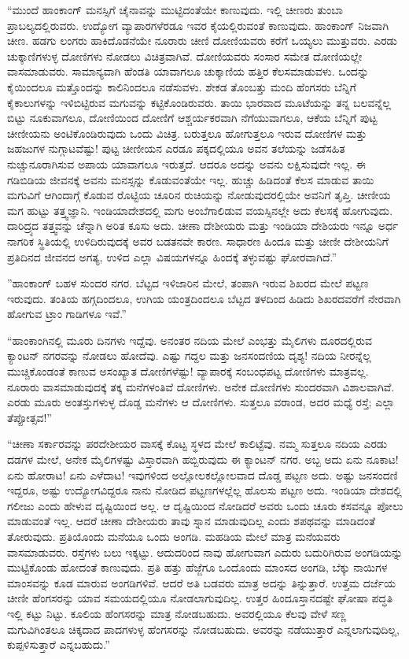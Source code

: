  “ಮುಂದೆ ಹಾಂಕಾಂಗ್ ಮನಸ್ಸಿಗೆ ಚೈನಾವನ್ನು ಮುಟ್ಟಿದಂತೆಯೇ ಕಾಣುವುದು. ಇಲ್ಲಿ ಚೀಣರು ತುಂಬಾ ಪ್ರಾಬಲ್ಯದಲ್ಲಿರುವರು. ಉದ್ಯೋಗ ವ್ಯಾಪಾರಗಳೆರಡೂ ಇವರ ಕೈಯಲ್ಲಿರುವಂತೆ ಕಾಣುವುದು. ಹಾಂಕಾಂಗ್ ನಿಜವಾಗಿ ಚೀಣ. ಹಡಗು ಲಂಗರು ಹಾಕಿದೊಡನೆಯೇ ನೂರಾರು ಚೀಣಿ ದೋಣಿಯವರು ಕರೆಗೆ ಒಯ್ಯಲು ಮುತ್ತುವರು. ಎರಡು ಚುಕ್ಕಾಣಿಗಳುಳ್ಳ ದೋಣಿಗಳು ನೋಡಲು ವಿಚಿತ್ರವಾಗಿವೆ. ದೋಣಿಯವರು ಸಂಸಾರ ಸಮೇತ ದೋಣಿಯಲ್ಲೇ ವಾಸಮಾಡುವರು. ಸಾಮಾನ್ಯವಾಗಿ ಹೆಂಡತಿ ಯಾವಾಗಲೂ ಚುಕ್ಕಾಣಿಯ ಹತ್ತಿರ ಕೆಲಸಮಾಡುವಳು. ಒಂದನ್ನು ಕೈಯಿಂದಲೂ ಮತ್ತೊಂದನ್ನು ಕಾಲಿನಿಂದಲೂ ನಡೆಸುವಳು. ಶೇಕಡ ತೊಂಬತ್ತು ಮಂದಿ ಹೆಂಗಸರು ಬೆನ್ನಿಗೆ ಕೈಕಾಲುಗಳನ್ನು ಇಳಿಬಿಟ್ಟಿರುವ ಮಗುವನ್ನು ಕಟ್ಟಿಕೊಂಡಿರುವರು. ತಾಯಿ ಭಾರವಾದ ಮೂಟೆಯನ್ನು ತನ್ನ ಬಲವನ್ನೆಲ್ಲ ಬಿಟ್ಟು ನೂಕುವಾಗಲೂ, ದೋಣಿಯಿಂದ ದೋಣಿಗೆ ಆಶ್ಚರ್ಯಕರವಾಗಿ ನೆಗೆಯುವಾಗಲೂ, ಆಕೆಯ ಬೆನ್ನಿಗೆ ಪುಟ್ಟ ಚೀಣೀಯನು ಅಂಟಿಕೊಂಡಿರುವುದು ಒಂದು ವಿಚಿತ್ರ. ಬರುತ್ತಲೂ ಹೋಗುತ್ತಲೂ ಇರುವ ದೋಣಿಗಳ ಮತ್ತು ಜಹಜುಗಳ ನುಗ್ಗಾಟವೆಷ್ಟು! ಪುಟ್ಟ ಚೀಣೀಯನ ಎರಡೂ ಪಕ್ಕದಲ್ಲಿಯೂ ಅವನ ತಲೆಯನ್ನು ಜಡೆಸಹಿತ ನುಚ್ಚುನೂರಾಗಿಸುವ ಅಪಾಯ ಯಾವಾಗಲೂ ಇರುತ್ತದೆ. ಆದರೂ ಅದನ್ನು ಅವನು ಲಕ್ಷಿಸುವುದೇ ಇಲ್ಲ. ಈ ಗಡಿಬಿಡಿಯ ಜೀವನಕ್ಕೆ ಅವನು ಮನಸ್ಸನ್ನು ಕೊಡುವಂತೆಯೇ ಇಲ್ಲ. ಹುಚ್ಚು ಹಿಡಿದಂತೆ ಕೆಲಸ ಮಾಡುವ ತಾಯಿ ಮಗುವಿಗೆ ಆಗಿಂದಾಗ್ಗೆ ಕೊಡುವ ರೊಟ್ಟಿಯ ಚೂರಿನ ರುಚಿಯನ್ನು ನೋಡುವುದರಲ್ಲಿಯೇ ಅವನಿಗೆ ತೃಪ್ತಿ. ಚೀಣೀಯ ಮಗ ಹುಟ್ಟು ತತ್ತ್ವಜ್ಞಾನಿ. ಇಂಡಿಯಾದೇಶದಲ್ಲಿ ಮಗು ಅಂಬೆಗಾಲಿಡುವ ವಯಸ್ಸಿನಲ್ಲೇ ಅದು ಕೆಲಸಕ್ಕೆ ಹೋಗುವುದು. ದಾರಿದ್ರ್ಯದ ತತ್ತ್ವವನ್ನು ಚೆನ್ನಾಗಿ ಅರಿತ ಕೂಸು ಅದು. ಚೀಣಾ ದೇಶೀಯರು ಮತ್ತು ಇಂಡಿಯಾ ದೇಶಿಯರು ಇನ್ನೂ ಅರ್ಧ ನಾಗರಿಕ ಸ್ಥಿತಿಯಲ್ಲಿ ಉಳಿದಿರುವುದಕ್ಕೆ ಅವರ ಬಡತನವೇ ಕಾರಣ. ಸಾಧಾರಣ ಹಿಂದೂ ಮತ್ತು ಚೀಣೀ ದೇಶೀಯನಿಗೆ ಪ್ರತಿದಿನದ ಜೀವನದ ಅಗತ್ಯ, ಉಳಿದ ಎಲ್ಲಾ ವಿಷಯಗಳನ್ನೂ ಹಿಂದಕ್ಕೆ ತಳ್ಳುವಷ್ಟು ಘೋರವಾಗಿದೆ.” 

”ಹಾಂಕಾಂಗ್ ಬಹಳ ಸುಂದರ ನಗರ. ಬೆಟ್ಟದ ಇಳಿಜಾರಿನ ಮೇಲೆ, ತಂಪಾಗಿ ಇರುವ ಶಿಖರದ ಮೇಲೆ ಪಟ್ಟಣ ಇರುವುದು. ತಂತಿಯ ಹಗ್ಗದಿಂದಲೂ, ಉಗಿಯ ಯಂತ್ರದಿಂದಲೂ ಬೆಟ್ಟದ ತಳದಿಂದ ಹಿಡಿದು ಶಿಖರದವರೆಗೆ ನೇರವಾಗಿ ಹೋಗುವ ಟ್ರಾಂ ಗಾಡಿಗಳೂ ಇವೆ.” 

 “ಹಾಂಕಾಂಗಿನಲ್ಲಿ ಮೂರು ದಿನಗಳು ಇದ್ದೆವು. ಅನಂತರ ನದಿಯ ಮೇಲೆ ಎಂಭತ್ತು ಮೈಲಿಗಳು ದೂರದಲ್ಲಿರುವ ಕ್ಯಾಂಟನ್ ನಗರವನ್ನು ನೋಡಲು ಹೋದೆವು. ಎಷ್ಟು ಗದ್ದಲ ಮತ್ತು ಜನಸಂದಣಿಯ ದೃಶ್ಯ! ನದಿಯ ನೀರನ್ನೆಲ್ಲ ಮುಚ್ಚಿಕೊಂಡಂತೆ ಕಾಣುವ ಅಸಂಖ್ಯಾತ ದೋಣಿಗಳೆಷ್ಟು! ವ್ಯಾಪಾರಕ್ಕೆ ಸಂಬಂಧಪಟ್ಟ ದೋಣಿಗಳು ಮಾತ್ರವಲ್ಲ. ನೂರಾರು ವಾಸಮಾಡುವುದಕ್ಕೆ ತಕ್ಕ ಮನೆಗಳಂತಿವೆ ದೋಣಿಗಳು. ಅನೇಕ ದೋಣಿಗಳು ಸುಂದರವಾಗಿ ವಿಶಾಲವಾಗಿವೆ. ಎರಡು ಮೂರು ಅಂತಸ್ತುಗಳುಳ್ಳ ದೊಡ್ಡ ಮನೆಗಳು ಆ ದೋಣಿಗಳು. ಸುತ್ತಲೂ ವರಾಂಡ, ಅದರ ಮಧ್ಯೆ ರಸ್ತೆ; ಎಲ್ಲಾ ತೆಪ್ಪೋತ್ಸವ!” 

 “ಚೀಣಾ ಸರ್ಕಾರವನ್ನು ಪರದೇಶೀಯರ ವಾಸಕ್ಕೆ ಕೊಟ್ಟ ಸ್ಥಳದ ಮೇಲೆ ಕಾಲಿಟ್ಟೆವು. ನಮ್ಮ ಸುತ್ತಲೂ ನದಿಯ ಎರಡು ದಡಗಳ ಮೇಲೆ, ಅನೇಕ ಮೈಲಿಗಳಷ್ಟು ವಿಸ್ತಾರವಾಗಿ ಹಬ್ಬಿರುವುದು ಈ ಕ್ಯಾಂಟನ್ ನಗರ. ಅಬ್ಬ ಅದು ಏನು ನೂಕಾಟ! ಏನು ಹೋರಾಟ! ಏನು ಎಳೆದಾಟ! ಇವುಗಳಿಂದ ಅಲ್ಲೋಲಕಲ್ಲೋಲವಾದ ದೊಡ್ಡ ಪಟ್ಟಣ ಅದು. ಅಷ್ಟು ಜನಸಂದಣಿ ಇದ್ದರೂ, ಅಷ್ಟು ಉದ್ಯೋಗವಿದ್ದರೂ ನಾನು ನೋಡಿದ ಪಟ್ಟಣಗಳಲ್ಲೆಲ್ಲ ಹೊಲಸು ಪಟ್ಟಣ ಅದು. ಇಂಡಿಯಾ ದೇಶದಲ್ಲಿ ಗಲೀಜು ಎಂದು ಹೇಳುವ ದೃಷ್ಟಿಯಿಂದ ಅಲ್ಲ. ಆ ದೃಷ್ಟಿಯಿಂದ ನೋಡಿದರೆ ಅವರು ಒಂದು ಚೂರು ಕಸವನ್ನೂ ಪೋಲು ಮಾಡುವಂತೆ ಇಲ್ಲ. ಆದರೆ ಚೀಣಾ ದೇಶೀಯರು ತಾವು ಸ್ನಾನ ಮಾಡುವುದಿಲ್ಲ ಎಂದು ಶಪಥವನ್ನು ಮಾಡಿದಂತೆ ತೋರುವುದು. ಪ್ರತಿಯೊಂದು ಮನೆಯೂ ಒಂದು ಅಂಗಡಿ. ಮಹಡಿಯ ಮೇಲೆ ಮಾತ್ರ ಮನೆಯವರು ವಾಸಮಾಡುವರು. ರಸ್ತೆಗಳು ಬಲು ಇಕ್ಕಟ್ಟು. ಆದುದರಿಂದ ನಾವು ಹೋಗುವಾಗ ಎದುರು ಬದುರಿಗಿರುವ ಅಂಗಡಿಯನ್ನು ಮುಟ್ಟಿಕೊಂಡು ಹೋದಂತೆ ಕಾಣುವುದು. ಪ್ರತಿ ಹತ್ತು ಹೆಜ್ಜೆಗೂ ಒಂದೊಂದು ಮಾಂಸದ ಅಂಗಡಿ, ಬೆಕ್ಕು ನಾಯಿಗಳ ಮಾಂಸವನ್ನು ಕೂಡ ಮಾರುವ ಅಂಗಡಿಗಳಿವೆ. ಆದರೆ ಅತಿ ಬಡವರು ಮಾತ್ರ ಅದನ್ನು ತಿನ್ನುತ್ತಾರೆ. ಉತ್ತಮ ದರ್ಜೆಯ ಚೀಣೀ ಹೆಂಗಸರನ್ನು ಯಾವ ಸಮಯದಲ್ಲಿಯೂ ನೋಡಲಾಗುವುದಿಲ್ಲ. ಉತ್ತರ ಹಿಂದೂಸ್ತಾನದಷ್ಟೇ ಘೋಷಾ ಪದ್ಧತಿ ಇಲ್ಲಿ ಕಟ್ಟು ನಿಟ್ಟು. ಕೂಲಿಯ ಹೆಂಗಸರನ್ನು ಮಾತ್ರ ನೋಡಬಹುದು. ಅವರಲ್ಲಿಯೂ ಕೆಲವು ವೇಳೆ ಸಣ್ಣ ಮಗುವಿಗಿಂತಲೂ ಚಿಕ್ಕದಾದ ಪಾದಗಳುಳ್ಳ ಹೆಂಗಸರನ್ನು ನೋಡಬಹುದು. ಅವರನ್ನು ನಡೆಯುತ್ತಾರೆ ಎನ್ನಲಾಗುವುದಿಲ್ಲ, ಕುಪ್ಪಳಿಸುತ್ತಾರೆ ಎನ್ನಬಹುದು.” 

